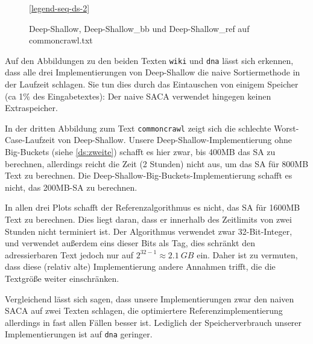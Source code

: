 \begin{figure}[!h]

    \medskip
    \ref{legend-seq-ds-2}
    \caption{Deep-Shallow, Deep-Shallow\_bb und Deep-Shallow\_ref auf commoncrawl.txt}
    \label{fig-seq-ds-2}
\end{figure}
\FloatBarrier

\noindent
Auf  den Abbildungen zu den beiden Texten \texttt{wiki} und \texttt{dna} lässt sich erkennen,
dass alle drei Implementierungen von Deep-Shallow die naive Sortiermethode in der Laufzeit schlagen.
Sie tun dies durch das Eintauschen von einigem Speicher (ca 1\% des Eingabetextes):
Der naive SACA verwendet hingegen keinen Extraspeicher.

In der dritten Abbildung zum Text \texttt{commoncrawl} zeigt sich die schlechte
Worst-Case-Laufzeit von Deep-Shallow.
Unsere Deep-Shallow-Implementierung ohne Big-Buckets (siehe \cref{ds:zweite}) schafft es hier zwar,
bis 400MB das SA zu berechnen, allerdings reicht die Zeit (2 Stunden) nicht aus, um das SA für 800MB Text zu berechnen.
Die Deep-Shallow-Big-Buckets-Implementierung schafft es nicht, das 200MB-SA zu berechnen.

In allen drei Plots schafft der Referenzalgorithmus es nicht, das SA für 1600MB Text zu berechnen.
Dies liegt daran, dass er innerhalb des Zeitlimits von zwei Stunden nicht terminiert ist.
Der Algorithmus verwendet zwar 32-Bit-Integer, und verwendet außerdem eins dieser Bits als Tag,
dies schränkt den adressierbaren Text jedoch nur auf $2^{32 - 1} \approx \SI{2.1}{GB}$ ein.
Daher ist zu vermuten, dass diese (relativ alte) Implementierung andere Annahmen trifft,
die die Textgröße weiter einschränken.

Vergleichend lässt sich sagen, dass unsere Implementierungen zwar den naiven SACA auf zwei Texten schlagen,
die optimiertere Referenzimplementierung allerdings in fast allen Fällen besser ist.
Lediglich der Speicherverbrauch unserer Implementierungen ist auf \texttt{dna} geringer.
